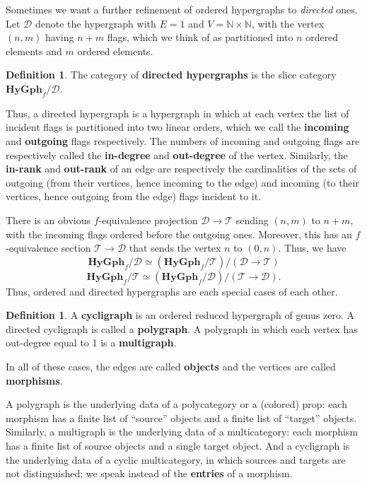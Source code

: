 \documentclass{article}
\theoremstyle{definition}
\newtheorem{defn}[thm]{Definition}
\theoremstyle{remark}
\def\N{\mathbb{N}}
\def\hy{\mathbf{HyGph}}
\def\thy{\mathcal{T}}
\def\dhy{\mathcal{D}}
\begin{document}
Sometimes we want a further refinement of ordered hypergraphs to \emph{directed} ones.
Let $\dhy$ denote the hypergraph with $E=1$ and $V=\N\times \N$, with the vertex $(n,m)$ having $n+m$ flags, which we think of as partitioned into $n$ ordered elements and $m$ ordered elements.

\begin{defn}
  The category of \textbf{directed hypergraphs} is the slice category $\hy_f/\dhy$.
\end{defn}

Thus, a directed hypergraph is a hypergraph in which at each vertex the list of incident flags is partitioned into two linear orders, which we call the \textbf{incoming} and \textbf{outgoing} flags respectively.
The numbers of incoming and outgoing flags are respectively called the \textbf{in-degree} and \textbf{out-degree} of the vertex.
Similarly, the \textbf{in-rank} and \textbf{out-rank} of an edge are respectively the cardinalities of the sets of outgoing (from their vertices, hence incoming to the edge) and incoming (to their vertices, hence outgoing from the edge) flags incident to it.

There is an obvious $f$-equivalence projection $\dhy\to\thy$ sending $(n,m)$ to $n+m$, with the incoming flags ordered before the outgoing ones.
Moreover, this has an $f$-equivalence section $\thy\to\dhy$ that sends the vertex $n$ to $(0,n)$.
Thus, we have
\[\hy_f/\dhy \simeq (\hy_f/\thy)/(\dhy\to\thy) \]
\[\hy_f/\thy \simeq (\hy_f/\dhy)/(\thy\to\dhy).\]
Thus, ordered and directed hypergraphs are each special cases of each other.

\begin{defn}
  A \textbf{cycligraph} is an ordered reduced hypergraph of genus zero.
  A directed cycligraph is called a \textbf{polygraph}.
  A polygraph in which each vertex has out-degree equal to 1 is a \textbf{multigraph}.

  In all of these cases, the edges are called \textbf{objects} and the vertices are called \textbf{morphisms}.
\end{defn}

A polygraph is the underlying data of a polycategory or a (colored) prop: each morphism has a finite list of ``source'' objects and a finite list of ``target'' objects.
Similarly, a multigraph is the underlying data of a multicategory: each morphism has a finite list of source objects and a single target object.
And a cycligraph is the underlying data of a cyclic multicategory, in which sources and targets are not distinguished; we speak instead of the \textbf{entries} of a morphism.
\end{document}
